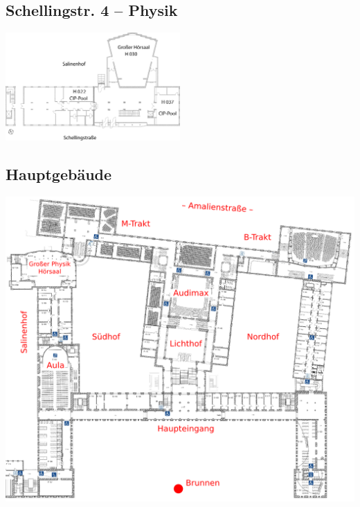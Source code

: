 \documentclass[twoside,12pt,parskip=half-]{scrartcl}
\begin{document}
\begin{center}
\subsection{Schellingstr. 4 -- Physik}

\includegraphics[width=0.5\textwidth]{schelling.png}

\subsection{Hauptgebäude}

\includegraphics[height=0.6\textheight]{hauptgeb.png}

\end{center}
\end{document}
